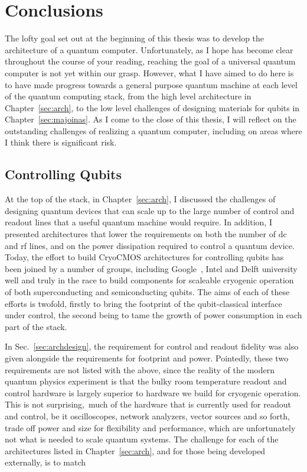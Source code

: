 \chapter{Conclusions}

The lofty goal set out at the beginning of this thesis was to develop the architecture of a quantum computer. Unfortunately,
as I hope has become clear throughout the course of your reading, reaching the goal of a universal quantum computer
is not yet within our grasp. However, what I have aimed to do here is to have made progress towards a general purpose quantum machine at each
level of the quantum computing stack, from the high level architecture in Chapter~\ref{sec:arch}, to the low level challenges
of designing materials for qubits in Chapter~\ref{sec:majoinas}. As I come to the close of this thesis, I will reflect on the outstanding
challenges of realizing a quantum computer, including on areas where I think there is significant risk.

\section{Controlling Qubits}
At the top of the stack, in Chapter~\ref{sec:arch}, I discussed the challenges of designing quantum devices that can scale up to the large number of
control and readout lines that a useful quantum machine would require. In addition, I presented architectures that lower the
requirements on both the number of dc and rf lines, and on the power dissipation required to control a quantum device. Today, the effort to build
CryoCMOS architectures for controlling qubits has been joined by a number of groups, including Google~\cite{gcryocmos}, Intel and Delft university~\cite{VANDIJK201990}
well and truly in the race to build components for scaleable cryogenic operation of both superconducting and semiconducting qubits. The aims of each
of these efforts is twofold, firstly to bring the footprint of the qubit-classical interface under control, the second being
to tame the growth of power consumption in each part of the stack.

In Sec.~\ref{sec:archdesign}, the requirement for control and readout fidelity was also given alongside the requirements for footprint and power. Pointedly,
these two requirements are not listed with the above, since the reality of the modern quantum physics experiment is that the bulky room temperature readout
and control hardware is largely superior to hardware we build for cryogenic operation. This is not surprising, much of the hardware that is currently used
for readout and control, be it oscilloscopes, network analyzers, vector sources and so forth, trade off power and size for flexibility and performance, which
are unfortunately not what is needed to scale quantum systems. The challenge for each of the architectures listed in Chapter~\ref{sec:arch}, and for those
being developed externally, is to match

